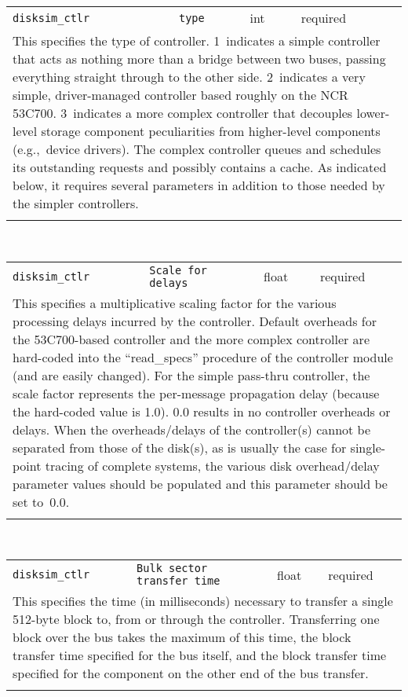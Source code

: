 \noindent 
\begin{tabular}{|p{1.5in}|p{3.5in}|p{0.5in}|p{0.5in}|}
\cline{1-4}
\texttt{disksim\_ctlr} & \texttt{type} & int & required \\ 
\cline{1-4}
\multicolumn{4}{|p{6in}|}{
This specifies the type of controller. 1~indicates a simple
controller that acts as nothing more than a bridge between two buses,
passing everything straight through to the other side. 2~indicates a
very simple, driver-managed controller based roughly on the NCR
53C700. 3~indicates a more complex controller that decouples
lower-level storage component peculiarities from higher-level
components (e.g.,~device drivers). The complex controller queues and
schedules its outstanding requests and possibly contains a cache. As
indicated below, it requires several parameters in addition to those
needed by the simpler controllers.
}\\ 
\cline{1-4}
\multicolumn{4}{p{5in}}{}\\
\end{tabular}\\ 
\noindent 
\begin{tabular}{|p{1.5in}|p{3.5in}|p{0.5in}|p{0.5in}|}
\cline{1-4}
\texttt{disksim\_ctlr} & \texttt{Scale for delays} & float & required \\ 
\cline{1-4}
\multicolumn{4}{|p{6in}|}{
This specifies a multiplicative scaling factor for the various
processing delays incurred by the controller. Default overheads for
the 53C700-based controller and the more complex controller are
hard-coded into the ``read\_specs'' procedure of the controller module
(and are easily changed). For the simple pass-thru controller, the
scale factor represents the per-message propagation delay (because the
hard-coded value is 1.0). 0.0 results in no controller overheads or
delays. When the overheads/delays of the controller(s) cannot be
separated from those of the disk(s), as is usually the case for
single-point tracing of complete systems, the various disk
overhead/delay parameter values should be populated and this parameter
should be set to~0.0.
}\\ 
\cline{1-4}
\multicolumn{4}{p{5in}}{}\\
\end{tabular}\\ 
\noindent 
\begin{tabular}{|p{1.5in}|p{3.5in}|p{0.5in}|p{0.5in}|}
\cline{1-4}
\texttt{disksim\_ctlr} & \texttt{Bulk sector transfer time} & float & required \\ 
\cline{1-4}
\multicolumn{4}{|p{6in}|}{
This specifies the time (in milliseconds) necessary to transfer a
single 512-byte block to, from or through the controller.
Transferring one block over the bus takes the maximum of this time,
the block transfer time specified for the bus itself, and the block
transfer time specified for the component on the other end of the bus
transfer.
}\\ 
\cline{1-4}
\multicolumn{4}{p{5in}}{}\\
\end{tabular}\\ 
